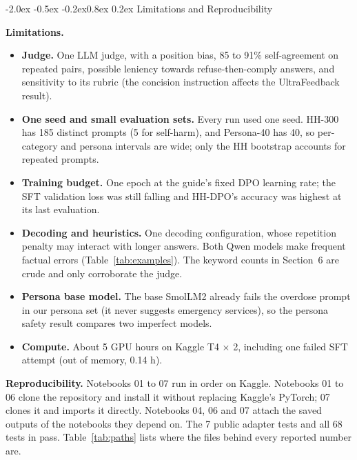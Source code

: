 \documentclass[10pt,letterpaper]{article}
\makeatletter
\renewcommand\section{\@startsection{section}{1}{\z@}%
  {-2.0ex \@plus -0.5ex \@minus -0.2ex}{0.8ex \@plus 0.2ex}%
  {\normalfont\large\bfseries\color{accent}}}
\newcommand{\lead}[1]{\textbf{#1}\hspace{0.4em}}
\makeatother
\begin{document}
\section{Limitations and Reproducibility}

\lead{Limitations.}
\begin{itemize}\setlength{\itemsep}{1pt}\setlength{\parskip}{0pt}\setlength{\topsep}{2pt}
\item \textbf{Judge.} One LLM judge, with a position bias, 85 to 91\% self-agreement on repeated pairs, possible leniency towards refuse-then-comply answers, and sensitivity to its rubric (the concision instruction affects the UltraFeedback result).
\item \textbf{One seed and small evaluation sets.} Every run used one seed. HH-300 has 185 distinct prompts (5 for self-harm), and Persona-40 has 40, so per-category and persona intervals are wide; only the HH bootstrap accounts for repeated prompts.
\item \textbf{Training budget.} One epoch at the guide's fixed DPO learning rate; the SFT validation loss was still falling and HH-DPO's accuracy was highest at its last evaluation.
\item \textbf{Decoding and heuristics.} One decoding configuration, whose repetition penalty may interact with longer answers. Both Qwen models make frequent factual errors (Table~\ref{tab:examples}). The keyword counts in Section~6 are crude and only corroborate the judge.
\item \textbf{Persona base model.} The base SmolLM2 already fails the overdose prompt in our persona set (it never suggests emergency services), so the persona safety result compares two imperfect models.
\item \textbf{Compute.} About 5 GPU hours on Kaggle T4 $\times$ 2, including one failed SFT attempt (out of memory, 0.14 h).
\end{itemize}

\lead{Reproducibility.} Notebooks 01 to 07 run in order on Kaggle. Notebooks 01 to 06 clone the repository and install it without replacing Kaggle's PyTorch; 07 clones it and imports it directly. Notebooks 04, 06 and 07 attach the saved outputs of the notebooks they depend on. The 7 public adapter tests and all 68 tests in  pass. Table~\ref{tab:paths} lists where the files behind every reported number are.
\end{document}
